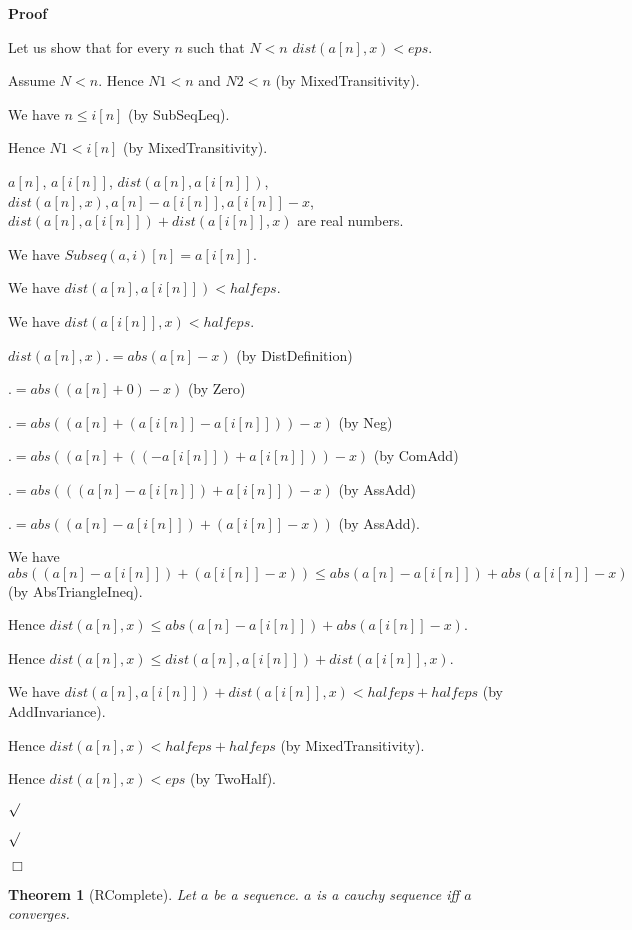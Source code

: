 \documentclass{article}
\newenvironment{forthel}{\begin{leftbar}}{\end{leftbar}}
\newenvironment{proof}{\noindent\textbf{Proof\ }}{\hspace*{\fill}$\Box$\medskip}
\newenvironment{subproof}{\begin{list}{}{}
		\item[\text{Proof}]}{\hfill $\surd$ \end{list}}
\newtheorem{theorem}{Theorem}
\begin{document}
\begin{forthel}
\begin{proof}
\begin{subproof}
			Let us show that for every $n$ such that $N < n$ $dist(a[n],x) < eps$.
			
			\begin{subproof}
				Assume $N < n$. Hence $N1 < n$ and $N2 < n$ (by MixedTransitivity).
				
				We have $n \leq i[n]$ (by SubSeqLeq).
				
				Hence $N1 < i[n]$ (by MixedTransitivity).
				
				$a[n]$, $a[i[n]]$, $dist(a[n],a[i[n]])$, $dist(a[n],x), a[n] - a[i[n]], a[i[n]] - x$, $dist(a[n],a[i[n]]) + dist(a[i[n]],x)$ are real numbers.
				
				We have $Subseq(a,i)[n] = a[i[n]]$.
				
				We have $dist(a[n],a[i[n]]) < halfeps$.
				
				We have $dist(a[i[n]],x) < halfeps$.
				
				$dist(a[n],x) .= abs(a[n] - x)$ (by DistDefinition)
				
				$.= abs((a[n] + 0) - x)$ (by Zero)
				
				$.= abs((a[n] + (a[i[n]] - a[i[n]])) - x)$ (by Neg)
				
				$.= abs((a[n] + ((-a[i[n]]) + a[i[n]])) - x)$ (by ComAdd)
				
				$.= abs(((a[n] - a[i[n]]) + a[i[n]]) - x)$ (by AssAdd)
				
				$.= abs((a[n] - a[i[n]]) + (a[i[n]] - x))$ (by AssAdd).
				
				We have $abs((a[n] - a[i[n]]) + (a[i[n]] - x)) \leq abs(a[n] - a[i[n]]) + abs(a[i[n]] - x)$ (by AbsTriangleIneq).
				
				Hence $dist(a[n],x) \leq abs(a[n] - a[i[n]]) + abs(a[i[n]] - x)$.
				
				Hence $dist(a[n],x) \leq dist(a[n],a[i[n]]) + dist(a[i[n]],x)$.
				
				We have $dist(a[n],a[i[n]]) + dist(a[i[n]],x) < halfeps + halfeps$ (by AddInvariance).
				
				Hence $dist(a[n],x) < halfeps + halfeps$ (by MixedTransitivity).
				
				Hence $dist(a[n],x) < eps$ (by TwoHalf).
				
			\end{subproof}
			
		\end{subproof}
	\end{proof}
	
	\begin{theorem}[RComplete]
		Let $a$ be a sequence. $a$ is a cauchy sequence iff $a$ converges.
	\end{theorem}
	

\end{forthel}
\end{document}
